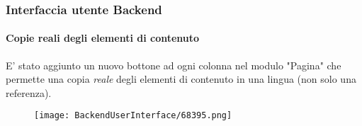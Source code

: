 \begin{frame}[fragile]
	\frametitle{Interfaccia utente Backend}
	\framesubtitle{Copie reali degli elementi di contenuto}

	E' stato aggiunto un nuovo bottone ad ogni colonna nel modulo "Pagina" che permette una copia \textit{reale} 
	degli elementi di contenuto in una lingua (non solo una referenza).

	\begin{figure}
		\texttt{[image: BackendUserInterface/68395.png]}
	\end{figure}

\end{frame}


